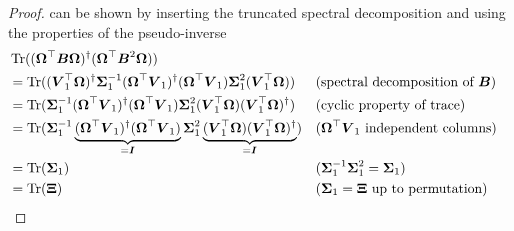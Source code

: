 \begin{proof}
     can be shown by inserting the truncated
    spectral decomposition 
    and using the properties of the pseudo-inverse
    \begin{align*}
        &\operatorname{Tr}((\boldsymbol{\Omega}^{\top} \boldsymbol{B} \boldsymbol{\Omega})^{\dagger}(\boldsymbol{\Omega}^{\top} \boldsymbol{B}^2 \boldsymbol{\Omega})) \notag \\
            &= \operatorname{Tr}((\boldsymbol{V}_1^{\top} \boldsymbol{\Omega})^{\dagger} \boldsymbol{\Sigma}_1^{-1} (\boldsymbol{\Omega}^{\top} \boldsymbol{V}_1)^{\dagger} (\boldsymbol{\Omega}^{\top} \boldsymbol{V}_1) \boldsymbol{\Sigma}_1^2 (\boldsymbol{V}_1^{\top} \boldsymbol{\Omega})) &&\text{(spectral decomposition of $\boldsymbol{B}$)} \notag \\
            &= \operatorname{Tr}(\boldsymbol{\Sigma}_1^{-1} (\boldsymbol{\Omega}^{\top} \boldsymbol{V}_1)^{\dagger} (\boldsymbol{\Omega}^{\top} \boldsymbol{V}_1)\boldsymbol{\Sigma}_1^2 (\boldsymbol{V}_1^{\top} \boldsymbol{\Omega}) (\boldsymbol{V}_1^{\top} \boldsymbol{\Omega})^{\dagger}) &&\text{(cyclic property of trace)} \notag \\
            &= \operatorname{Tr}(\boldsymbol{\Sigma}_1^{-1} \underbrace{(\boldsymbol{\Omega}^{\top} \boldsymbol{V}_1)^{\dagger} (\boldsymbol{\Omega}^{\top} \boldsymbol{V}_1)}_{=\boldsymbol{I}} \boldsymbol{\Sigma}_1^2 \underbrace{(\boldsymbol{V}_1^{\top} \boldsymbol{\Omega}) (\boldsymbol{V}_1^{\top} \boldsymbol{\Omega})^{\dagger}}_{=\boldsymbol{I}}) &&\text{($\boldsymbol{\Omega}^{\top} \boldsymbol{V}_1$ independent columns)} \notag \\
            &= \operatorname{Tr}(\boldsymbol{\Sigma}_1) &&\text{($\boldsymbol{\Sigma}_1^{-1} \boldsymbol{\Sigma}_1^{2} = \boldsymbol{\Sigma}_1$)}  \notag \\
            &= \operatorname{Tr}(\boldsymbol{\Xi}) &&\text{($\boldsymbol{\Sigma}_1 = \boldsymbol{\Xi}$ up to permutation)}
    \end{align*}
\end{proof}

